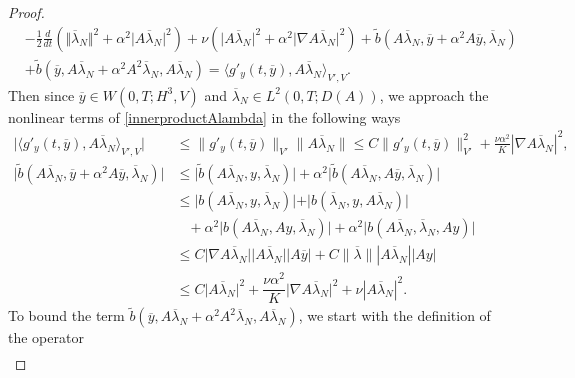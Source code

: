 \documentclass[reqno]{amsart}
\begin{document}
\begin{proof}
		\begin{align}
			&-\frac{1}{2} \frac{d}{dt} \left(\Vert \overline{\lambda}_N \Vert^2 + \alpha^2 \vert A\overline{\lambda}_N \vert^2 \right) + \nu \left( \vert A\overline{\lambda}_N \vert ^2 + \alpha^2 \vert \nabla A \overline{\lambda}_N \vert^2 \right) + \widetilde{b} (A\overline{\lambda}_N, \overline{y} + \alpha^2 A \overline{y},  \overline{\lambda}_N) \nonumber \\
			&+\widetilde{b} (\overline{y}, A\overline{\lambda}_N+ \alpha^2 A^2 \overline{\lambda}_N, A \overline{\lambda}_N) = \langle g'_y(t,\overline{y}), A\overline{\lambda}_N\rangle_{V',V}. \label{innerproductAlambda}
		\end{align}
		Then since $ \overline{y} \in W(0,T;H^3,V) $ and $ \overline{\lambda}_N \in L^2(0,T;D(A)) $, we approach the nonlinear terms of \eqref{innerproductAlambda} in the following ways
		\begin{align*}
			\vert \langle g'_y(t,\overline{y}), A\overline{\lambda}_N\rangle_{V',V} \vert &\leq \| g'_y(t,\overline{y}) \|_{V'} \| A\overline{\lambda}_N \| \leq C\| g'_y(t,\overline{y}) \|^2_{V'} + \frac{\nu\alpha^2}{K} |\nabla A \overline{\lambda}_N |^2, \\
			\vert \widetilde{b}(A\overline{\lambda}_N, \overline{y} + \alpha^2 A \overline{y},  \overline{\lambda}_N) \vert &\leq \vert \widetilde{b}(A\overline{\lambda}_N,y, \overline{\lambda}_N) \vert + \alpha^2 \vert \widetilde{b}(A\overline{\lambda}_N, A\overline{y},\overline{\lambda}_N) \vert \\
			&\leq \vert b(A\overline{\lambda}_N, y, \overline{\lambda}_N) \vert +\vert b(\overline{\lambda}_N, y, A\overline{\lambda}_N) \vert \\
			&\hspace{10pt}+\alpha^2 \vert b(A\overline{\lambda}_N, Ay, \overline{\lambda}_N) \vert + \alpha^2 \vert b(A\overline{\lambda}_N, \overline{\lambda}_N, Ay) \vert \\
			&\leq C \vert \nabla A\overline{\lambda}_N \vert \vert A\overline{\lambda}_N \vert | A\overline{y} |+C\|\overline{\lambda}\||A\overline{\lambda}_N||Ay|\\
			&\leq C\vert A \overline{\lambda}_N \vert^2 + \dfrac{\nu\alpha^2}{K} \vert \nabla A\overline{\lambda}_N \vert^2 + \nu|A\overline{\lambda}_N|^2.
		\end{align*}
		To bound the term $ \widetilde{b} (\overline{y}, A\overline{\lambda}_N+ \alpha^2 A^2 \overline{\lambda}_N, A \overline{\lambda}_N) $, we start with the definition of the operator
		\begin{align*}

\end{align*}
\end{proof}
\end{document}
